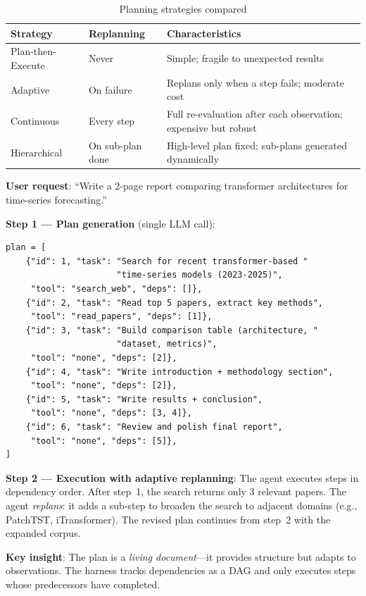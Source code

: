 \begin{table}[ht!]
\centering
\caption{Planning strategies compared}
\begin{tabular}{@{}lp{5cm}p{8cm}@{}}
\toprule
\textbf{Strategy} & \textbf{Replanning} & \textbf{Characteristics} \\
\midrule
Plan-then-Execute & Never & Simple; fragile to unexpected results \\
Adaptive & On failure & Replans only when a step fails; moderate cost \\
Continuous & Every step & Full re-evaluation after each observation; expensive but robust \\
Hierarchical & On sub-plan done & High-level plan fixed; sub-plans generated dynamically \\
\bottomrule
\end{tabular}
\end{table}

\begin{examplebox}
\textbf{User request}: ``Write a 2-page report comparing transformer architectures for time-series forecasting.''

\textbf{Step 1 --- Plan generation} (single LLM call):

\begin{lstlisting}[style=pythonstyle]
plan = [
    {"id": 1, "task": "Search for recent transformer-based "
                      "time-series models (2023-2025)",
     "tool": "search_web", "deps": []},
    {"id": 2, "task": "Read top 5 papers, extract key methods",
     "tool": "read_papers", "deps": [1]},
    {"id": 3, "task": "Build comparison table (architecture, "
                      "dataset, metrics)",
     "tool": "none", "deps": [2]},
    {"id": 4, "task": "Write introduction + methodology section",
     "tool": "none", "deps": [2]},
    {"id": 5, "task": "Write results + conclusion",
     "tool": "none", "deps": [3, 4]},
    {"id": 6, "task": "Review and polish final report",
     "tool": "none", "deps": [5]},
]
\end{lstlisting}

\textbf{Step 2 --- Execution with adaptive replanning}: The agent executes steps in dependency order. After step~1, the search returns only 3 relevant papers. The agent \emph{replans}: it adds a sub-step to broaden the search to adjacent domains (e.g., PatchTST, iTransformer). The revised plan continues from step~2 with the expanded corpus.

\textbf{Key insight}: The plan is a \emph{living document}---it provides structure but adapts to observations. The harness tracks dependencies as a DAG and only executes steps whose predecessors have completed.
\end{examplebox}

